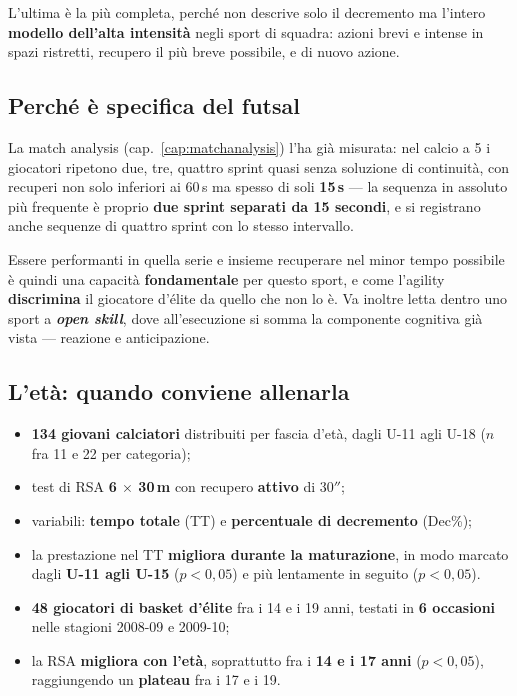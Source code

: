 L'ultima è la più completa, perché non descrive solo il decremento ma l'intero \textbf{modello
dell'alta intensità} negli sport di squadra: azioni brevi e intense in spazi ristretti, recupero
il più breve possibile, e di nuovo azione.

\subsection{Perché è specifica del futsal}

La match analysis (cap.~\ref{cap:matchanalysis}) l'ha già misurata: nel calcio a 5 i giocatori
ripetono due, tre, quattro sprint quasi senza soluzione di continuità, con recuperi non solo
inferiori ai 60\,s ma spesso di soli \textbf{15\,s} --- la sequenza in assoluto più frequente è
proprio \textbf{due sprint separati da 15 secondi}, e si registrano anche sequenze di quattro
sprint con lo stesso intervallo.

Essere performanti in quella serie e insieme recuperare nel minor tempo possibile è quindi una
capacità \textbf{fondamentale} per questo sport, e come l'agility \textbf{discrimina} il giocatore
d'élite da quello che non lo è. Va inoltre letta dentro uno sport a \textbf{\textit{open skill}},
dove all'esecuzione si somma la componente cognitiva già vista --- reazione e anticipazione.

\subsection{L'età: quando conviene allenarla}

\begin{itemize}
  \item \textbf{134 giovani calciatori} distribuiti per fascia d'età, dagli U-11 agli U-18
    ($n$ fra 11 e 22 per categoria);
  \item test di RSA \textbf{6 $\times$ 30\,m} con recupero \textbf{attivo} di 30$''$;
  \item variabili: \textbf{tempo totale} (TT) e \textbf{percentuale di decremento} (Dec\%);
  \item la prestazione nel TT \textbf{migliora durante la maturazione}, in modo marcato dagli
    \textbf{U-11 agli U-15} ($p < 0,05$) e più lentamente in seguito ($p < 0,05$).
\end{itemize}

\begin{itemize}
  \item \textbf{48 giocatori di basket d'élite} fra i 14 e i 19 anni, testati in \textbf{6
    occasioni} nelle stagioni 2008-09 e 2009-10;
  \item la RSA \textbf{migliora con l'età}, soprattutto fra i \textbf{14 e i 17 anni}
    ($p < 0,05$), raggiungendo un \textbf{plateau} fra i 17 e i 19.
\end{itemize}

